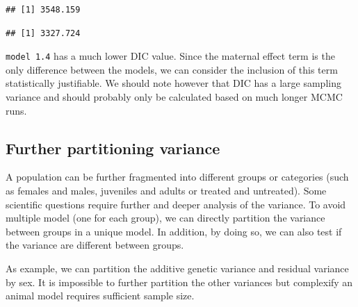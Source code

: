 \documentclass[
  12pt,
]{book}
\newenvironment{Shaded}{\begin{snugshade}}{\end{snugshade}}
\newcommand{\FloatTok}[1]{\textcolor[rgb]{0.00,0.00,0.81}{#1}}
\newcommand{\NormalTok}[1]{#1}
\newcommand{\OperatorTok}[1]{\textcolor[rgb]{0.81,0.36,0.00}{\textbf{#1}}}
\begin{document}
\begin{verbatim}
## [1] 3548.159
\end{verbatim}

\begin{Shaded}
\end{Shaded}

\begin{verbatim}
## [1] 3327.724
\end{verbatim}

\texttt{model\ 1.4} has a much lower DIC value. Since the maternal effect term is the only difference between the models, we can consider the inclusion of this term statistically justifiable. We should note however that DIC has a large sampling variance and should probably only be calculated based on much longer MCMC runs.

\hypertarget{further-partitioning-variance}{%
\subsection{Further partitioning variance}\label{further-partitioning-variance}}

A population can be further fragmented into different groups or categories (such as females and males, juveniles and adults or treated and untreated). Some scientific questions require further and deeper analysis of the variance.
To avoid multiple model (one for each group), we can directly partition the variance between groups in a unique model. In addition, by doing so, we can also test if the variance are different between groups.

As example, we can partition the additive genetic variance and residual variance by sex. It is impossible to further partition the other variances but complexify an animal model requires sufficient sample size.
\end{document}

